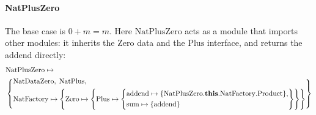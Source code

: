 \paragraph{NatPlusZero}
The base case is $0 + m = m$. Here $\mathrm{NatPlusZero}$ acts as a module that
imports other modules: it inherits the $\mathrm{Zero}$ data and the $\mathrm{Plus}$
interface, and returns the addend directly:
\[
  \begin{aligned}
    &\mathrm{NatPlusZero} \mapsto \\
    &\left\{
    \begin{aligned}
      &\mathrm{NatDataZero},\; \mathrm{NatPlus},\\
      &\mathrm{NatFactory} \mapsto \left\{\mathrm{Zero} \mapsto \left\{\mathrm{Plus} \mapsto \left\{
          \begin{aligned}
            &\mathrm{addend} \mapsto \{\mathrm{NatPlusZero}.\mathbf{this}.\mathrm{NatFactory}.\mathrm{Product}\},\\
            &\mathrm{sum} \mapsto \{\mathrm{addend}\}
      \end{aligned}\right\}\right\}\right\}
  \end{aligned}\right\}
  \end{aligned}
\]

